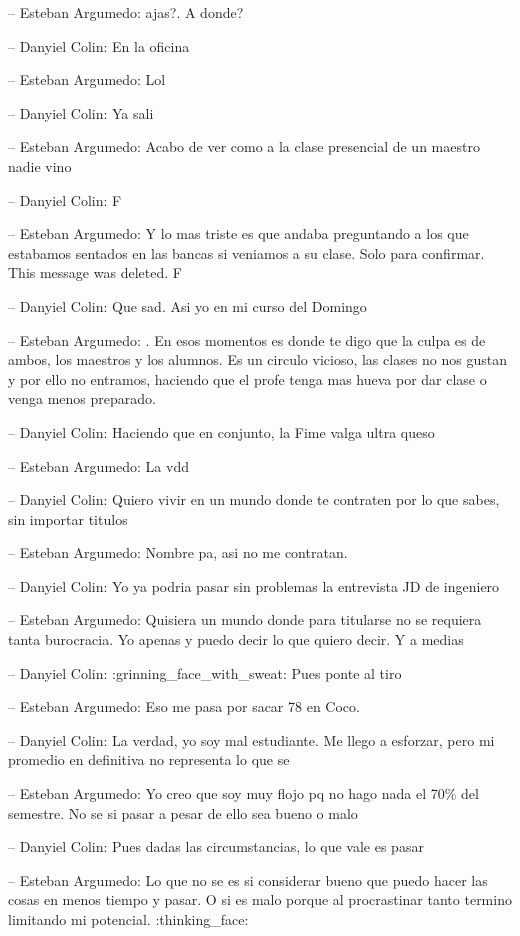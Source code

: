 -- Esteban Argumedo: ajas?. A donde?

-- Danyiel Colin: En la oficina

-- Esteban Argumedo: Lol

-- Danyiel Colin: Ya sali

-- Esteban Argumedo: Acabo de ver como a la clase presencial de un
maestro nadie vino

-- Danyiel Colin: F

-- Esteban Argumedo: Y lo mas triste es que andaba preguntando a los que
estabamos sentados en las bancas si veniamos a su clase. Solo para
confirmar. This message was deleted. F

-- Danyiel Colin: Que sad. Asi yo en mi curso del Domingo

-- Esteban Argumedo: . En esos momentos es donde te digo que la culpa es
de ambos, los maestros y los alumnos. Es un circulo vicioso, las clases
no nos gustan y por ello no entramos, haciendo que el profe tenga mas
hueva por dar clase o venga menos preparado.

-- Danyiel Colin: Haciendo que en conjunto, la Fime valga ultra queso

-- Esteban Argumedo: La vdd

-- Danyiel Colin: Quiero vivir en un mundo donde te contraten por lo que
sabes, sin importar titulos

-- Esteban Argumedo: Nombre pa, asi no me contratan.

-- Danyiel Colin: Yo ya podria pasar sin problemas la entrevista JD de
ingeniero

-- Esteban Argumedo: Quisiera un mundo donde para titularse no se
requiera tanta burocracia. Yo apenas y puedo decir lo que quiero decir.
Y a medias

-- Danyiel Colin: :grinning\_face\_with\_sweat: Pues ponte al tiro

-- Esteban Argumedo: Eso me pasa por sacar 78 en Coco.

-- Danyiel Colin: La verdad, yo soy mal estudiante. Me llego a esforzar,
pero mi promedio en definitiva no representa lo que se

-- Esteban Argumedo: Yo creo que soy muy flojo pq no hago nada el 70\%
del semestre. No se si pasar a pesar de ello sea bueno o malo

-- Danyiel Colin: Pues dadas las circumstancias, lo que vale es pasar

-- Esteban Argumedo: Lo que no se es si considerar bueno que puedo hacer
las cosas en menos tiempo y pasar. O si es malo porque al procrastinar
tanto termino limitando mi potencial. :thinking\_face:

